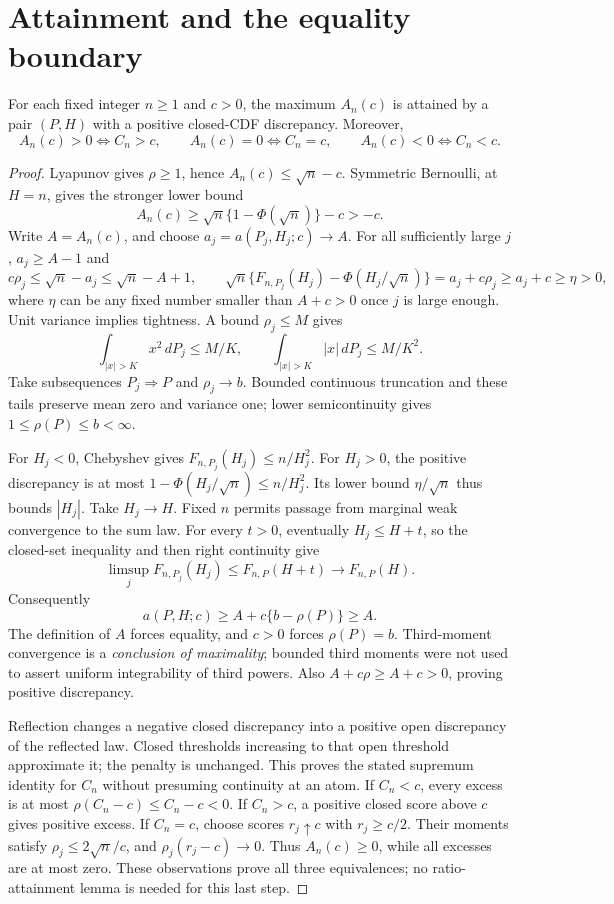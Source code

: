\section{Attainment and the equality boundary}
\begin{theorem}\label{thm:attain}
For each fixed integer $n\ge1$ and $c>0$, the maximum $A_n(c)$ is
attained by a pair $(P,H)$ with a positive closed-CDF discrepancy.
Moreover,
\[
 A_n(c)>0\iff C_n>c,\qquad
 A_n(c)=0\iff C_n=c,\qquad A_n(c)<0\iff C_n<c.
\]
\end{theorem}
\begin{proof}
Lyapunov gives $\rho\ge1$, hence $A_n(c)\le\sqrt n-c$. Symmetric
Bernoulli, at $H=n$, gives the stronger lower bound
\[
 A_n(c)\ge\sqrt n\{1-\Phi(\sqrt n)\}-c>-c.
\]
Write $A=A_n(c)$, and choose $a_j=a(P_j,H_j;c)\to A$. For all sufficiently
large $j$, $a_j\ge A-1$ and
\[
 c\rho_j\le\sqrt n-a_j\le\sqrt n-A+1,
 \qquad \sqrt n\{F_{n,P_j}(H_j)-\Phi(H_j/\sqrt n)\}
       =a_j+c\rho_j\ge a_j+c\ge\eta>0,
\]
where $\eta$ can be any fixed number smaller than $A+c>0$ once $j$ is
large enough. Unit variance implies tightness. A bound $\rho_j\le M$
gives
\[
 \int_{|x|>K}x^2\,dP_j\le M/K,
 \qquad\int_{|x|>K}|x|\,dP_j\le M/K^2.
\]
Take subsequences $P_j\Rightarrow P$ and $\rho_j\to b$. Bounded continuous
truncation and these tails preserve mean zero and variance one;
lower semicontinuity gives $1\le\rho(P)\le b<\infty$.

For $H_j<0$, Chebyshev gives $F_{n,P_j}(H_j)\le n/H_j^2$.
For $H_j>0$, the positive discrepancy is at most
$1-\Phi(H_j/\sqrt n)\le n/H_j^2$. Its lower bound $\eta/\sqrt n$ thus
bounds $|H_j|$. Take $H_j\to H$. Fixed $n$ permits passage from marginal
weak convergence to the sum law. For every $t>0$, eventually
$H_j\le H+t$, so the closed-set inequality and then right continuity give
\[
 \limsup_j F_{n,P_j}(H_j)\le F_{n,P}(H+t)
       \longrightarrow F_{n,P}(H).
\]
Consequently
\[
 a(P,H;c)\ge A+c\{b-\rho(P)\}\ge A.
\]
The definition of $A$ forces equality, and $c>0$ forces $\rho(P)=b$.
Third-moment convergence is a \emph{conclusion of maximality}; bounded
third moments were not used to assert uniform integrability of third
powers. Also $A+c\rho\ge A+c>0$, proving positive discrepancy.

Reflection changes a negative closed discrepancy into a positive open
discrepancy of the reflected law. Closed thresholds increasing to that
open threshold approximate it; the penalty is unchanged. This proves
the stated supremum identity for $C_n$ without presuming continuity at an
atom. If $C_n<c$, every excess is at most
$\rho(C_n-c)\le C_n-c<0$. If $C_n>c$, a positive closed score above $c$
gives positive excess. If $C_n=c$, choose scores $r_j\uparrow c$ with
$r_j\ge c/2$. Their moments satisfy $\rho_j\le2\sqrt n/c$, and
$\rho_j(r_j-c)\to0$. Thus $A_n(c)\ge0$, while all excesses are at most
zero. These observations prove all three equivalences; no ratio-attainment
lemma is needed for this last step.
\end{proof}

